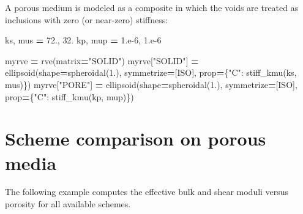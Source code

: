 \documentclass[
  a4paper,
  numbers=noendperiod,
  DIV=12]{scrreprt}
\newenvironment{Shaded}{\begin{snugshade}}{\end{snugshade}}
\newcommand{\FloatTok}[1]{\textcolor[rgb]{0.00,0.00,0.81}{#1}}
\newcommand{\NormalTok}[1]{#1}
\newcommand{\OperatorTok}[1]{\textcolor[rgb]{0.81,0.36,0.00}{\textbf{#1}}}
\newcommand{\StringTok}[1]{\textcolor[rgb]{0.31,0.60,0.02}{#1}}
\begin{document}
A porous medium is modeled as a composite in which the voids are treated
as inclusions with zero (or near-zero) stiffness:

\begin{Shaded}
\begin{Highlighting}[]
\NormalTok{ks, mus }\OperatorTok{=} \FloatTok{72.}\NormalTok{, }\FloatTok{32.}
\NormalTok{kp, mup }\OperatorTok{=} \FloatTok{1.e{-}6}\NormalTok{, }\FloatTok{1.e{-}6}

\NormalTok{myrve }\OperatorTok{=}\NormalTok{ rve(matrix}\OperatorTok{=}\StringTok{"SOLID"}\NormalTok{)}
\NormalTok{myrve[}\StringTok{"SOLID"}\NormalTok{] }\OperatorTok{=}\NormalTok{ ellipsoid(shape}\OperatorTok{=}\NormalTok{spheroidal(}\FloatTok{1.}\NormalTok{), symmetrize}\OperatorTok{=}\NormalTok{[ISO],}
\NormalTok{                           prop}\OperatorTok{=}\NormalTok{\{}\StringTok{"C"}\NormalTok{: stiff\_kmu(ks, mus)\})}
\NormalTok{myrve[}\StringTok{"PORE"}\NormalTok{] }\OperatorTok{=}\NormalTok{ ellipsoid(shape}\OperatorTok{=}\NormalTok{spheroidal(}\FloatTok{1.}\NormalTok{), symmetrize}\OperatorTok{=}\NormalTok{[ISO],}
\NormalTok{                          prop}\OperatorTok{=}\NormalTok{\{}\StringTok{"C"}\NormalTok{: stiff\_kmu(kp, mup)\})}
\end{Highlighting}
\end{Shaded}

\section{Scheme comparison on porous media}\label{sec-porous-comparison}

The following example computes the effective bulk and shear moduli
versus porosity for all available schemes.
\end{document}
